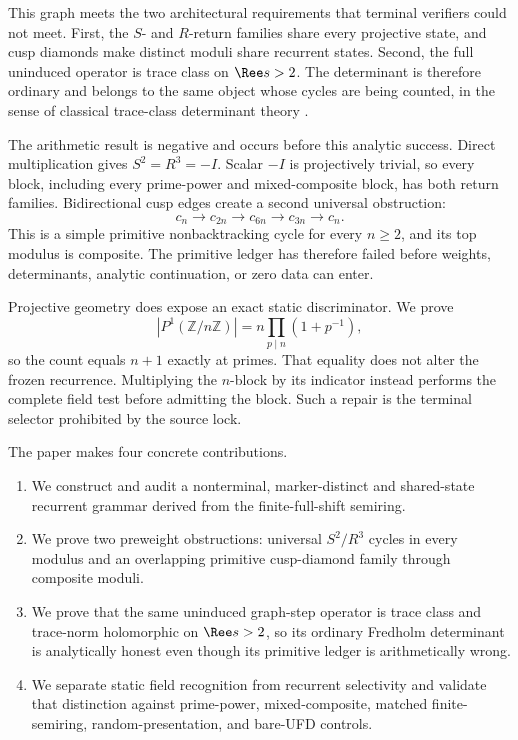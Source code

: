 This graph meets the two architectural requirements that terminal verifiers
could not meet.  First, the $S$- and $R$-return families share every
projective state, and cusp diamonds make distinct moduli share recurrent
states.  Second, the full uninduced operator is trace class on
$\Ree s>2$.  The determinant is therefore ordinary and belongs to the same
object whose cycles are being counted, in the sense of classical trace-class
determinant theory \citep{simon1977infinite}.

The arithmetic result is negative and occurs before this analytic success.
Direct multiplication gives $S^2=R^3=-I$.  Scalar $-I$ is projectively
trivial, so every block, including every prime-power and mixed-composite
block, has both return families.  Bidirectional cusp edges create a second
universal obstruction:
\[
 c_n\longrightarrow c_{2n}\longrightarrow c_{6n}
 \longrightarrow c_{3n}\longrightarrow c_n.
\]
This is a simple primitive nonbacktracking cycle for every $n\ge2$, and its
top modulus is composite.  The primitive ledger has therefore failed before
weights, determinants, analytic continuation, or zero data can enter.

Projective geometry does expose an exact static discriminator.  We prove
\[
 |P^1(\mathbb Z/n\mathbb Z)|
 =n\prod_{p\mid n}(1+p^{-1}),
\]
so the count equals $n+1$ exactly at primes.  That equality does not alter the
frozen recurrence.  Multiplying the $n$-block by its indicator instead
performs the complete field test before admitting the block.  Such a repair
is the terminal selector prohibited by the source lock.

The paper makes four concrete contributions.

\begin{enumerate}
  \item We construct and audit a nonterminal, marker-distinct and
  shared-state recurrent grammar derived from the finite-full-shift semiring.
  \item We prove two preweight obstructions: universal $S^2/R^3$ cycles in
  every modulus and an overlapping primitive cusp-diamond family through
  composite moduli.
  \item We prove that the same uninduced graph-step operator is trace class
  and trace-norm holomorphic on $\Ree s>2$, so its ordinary Fredholm
  determinant is analytically honest even though its primitive ledger is
  arithmetically wrong.
  \item We separate static field recognition from recurrent selectivity and
  validate that distinction against prime-power, mixed-composite, matched
  finite-semiring, random-presentation, and bare-UFD controls.
\end{enumerate}

